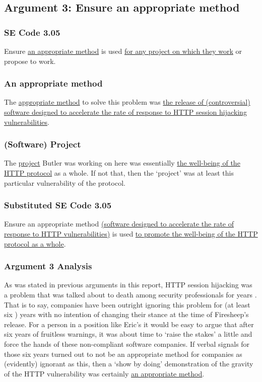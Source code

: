 \documentclass[11pt]{article}
\begin{document}
\begin{multicols}{2}
\subsection{Argument 3: Ensure an appropriate method}
\subsubsection{SE Code 3.05}
Ensure \uline{an appropriate method} is used \uline{for any project on which they work} or propose to work.

\subsubsection{An appropriate method}
The \uline{appropriate method} to solve this problem was \uline{the release of (controversial) software designed to accelerate the rate of response to HTTP session hijacking vulnerabilities}.

\subsubsection{(Software) Project}
The \uline{project} Butler was working on here was essentially \uline{the well-being of the HTTP protocol} as a whole. If not that, then the `project' was at least this particular vulnerability of the protocol.

\subsubsection{Substituted SE Code 3.05}
Ensure an appropriate method \uline{(software designed to accelerate the rate of response to HTTP vulnerabilities)} is used \uline{to promote the well-being of the HTTP protocol as a whole}.

\subsubsection{Argument 3 Analysis}
As was stated in previous arguments in this report, HTTP session hijacking was a problem that was talked about to death among security professionals for years \cite{firesheep-day-later}. That is to say, companies have been outright ignoring this problem for (at least six \cite{firesheep-day-later}) years with no intention of changing their stance at the time of Firesheep's release. For a person in a position like Eric's it would be easy to argue that after six years of fruitless warnings, it was about time to `raise the stakes' a little and force the hands of these non-compliant software companies. If verbal signals for those six years turned out to not be an appropriate method for companies as (evidently) ignorant as this, then a `show by doing' demonstration of the gravity of the HTTP vulnerability was certainly \uline{an appropriate method}.


\end{multicols}
\end{document}
